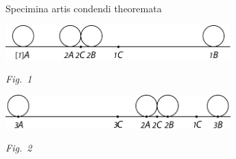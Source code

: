\pend%
\pstart%
\centering%
Specimina artis condendi theoremata
\pend%
\vspace{\baselineskip}
%
\vspace{1.0em}%
%
  \centerline{\includegraphics[width=0.65\textwidth]{gesamttex/edit_VIII,3/images/LH_37_05_144r-145v_d1_145v.pdf}} 
    \vspace{0.5em}
\centerline{\lbrack\textit{Fig.~1}\rbrack}
  \vspace{1.5em}
%
  \vspace{1.0em}
  \centerline{\includegraphics[width=0.65\textwidth]{gesamttex/edit_VIII,3/images/LH_37_05_144r-145v_d2_145v.pdf}} 
    \vspace{0.5em}
\centerline{\lbrack\textit{Fig.~2}\rbrack}
\newpage
\pstart\noindent
\hspace{1mm}\hspace{-1mm}%
%
%
